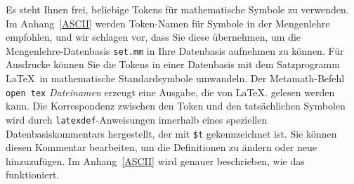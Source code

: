 Es steht Ihnen frei, beliebige Tokens für mathematische Symbole zu verwenden.  Im Anhang~\ref{ASCII} werden Token-Namen für Symbole in der Mengenlehre empfohlen, und wir schlagen vor, dass Sie diese übernehmen, um die Mengenlehre-Datenbasis \texttt{set.mm}  in Ihre Datenbasis aufnehmen zu können.  Für Ausdrucke können Sie die Tokens in einer Datenbasis mit dem Satzprogramm \LaTeX\ in mathematische Standardsymbole umwandeln.  Der Metamath-Befehl \texttt{open tex} {\em Dateinamen} erzeugt eine Ausgabe, die von \LaTeX. gelesen werden kann. Die Korrespondenz zwischen den Token und den tatsächlichen Symbolen wird durch \texttt{latexdef}-Anweisungen innerhalb eines speziellen Datenbasiskommentars hergestellt, der mit \texttt{\$t} gekennzeichnet ist.   Sie können diesen Kommentar bearbeiten, um die Definitionen zu ändern oder neue hinzuzufügen. Im Anhang~\ref{ASCII} wird genauer beschrieben, wie das funktioniert.


